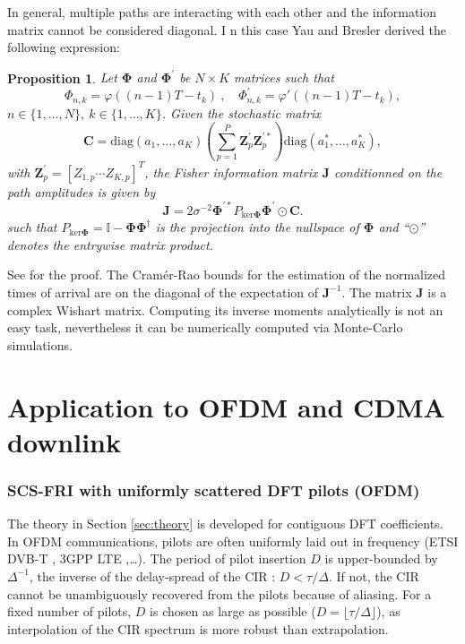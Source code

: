 \documentclass[journal,10pt]{IEEEtran}
\providecommand{\mat}[1]{\boldsymbol{#1}}
\providecommand{\vct}[1]{\boldsymbol{#1}}
\providecommand{\pinv}{\dag}
\providecommand{\pinv}{\text{\ding{61}}}
\newtheorem{proposition}{Proposition}
\begin{document}
In general,  multiple paths are interacting with each other and the information matrix cannot be considered diagonal. I	n this case Yau and Bresler \cite{Yau1992} derived the following expression:
\begin{proposition}\cite{Yau1992}\label{prop:nsep}
Let $\mat \Phi$ and $\mat \Phi^\prime$ be $N\times K$ matrices such that
$$\Phi_{n,k}=\varphi((n-1)T-t_k)\ ,\quad\Phi^\prime_{n,k}=\varphi\prime((n-1)T-t_k),$$
$n\in\lbrace 1,\dots,N \rbrace,\ k\in\lbrace 1,\dots,K \rbrace$. Given the stochastic matrix
$$\mat{C}= \text{diag}(a_1,\dots,a_K)\left(\sum_{p=1}^P\vct Z^\prime_p\vct Z^{\prime\ast}_p\right)\text{diag}(a_1^\ast,\dots,a_K^\ast),$$
with $\vct Z^\prime_p=[Z_{1,p}\cdots Z_{K,p}]^T$,
the Fisher information matrix $\mat J$ conditionned on the path amplitudes is given by
\begin{equation}
\mat J=2\sigma^{-2}\mat{\Phi}^{\prime\ast}P_{\text{ker}\mat{\Phi}}\mat{\Phi}^\prime\odot \mat{C}.
\end{equation}
such that $P_{\text{ker}\mat{\Phi}}=\mathbb{I}-\mat\Phi\mat\Phi^\pinv$ is the projection into the nullspace of $\mat\Phi$ and ``$\odot$'' denotes the entrywise matrix product.
\end{proposition}

See \cite{Yau1992} for the proof. The Cram\'er-Rao bounds  for the estimation of the normalized times of arrival are on the diagonal of the expectation of $\mat J^{-1}$.
The matrix $\mat J$ is a complex Wishart matrix. Computing its inverse moments analytically is not an easy task, nevertheless it can be numerically computed via Monte-Carlo simulations.
 

\section{Application to OFDM and CDMA downlink}\label{sec:ofdm}
\subsubsection{SCS-FRI with uniformly scattered DFT pilots (OFDM)}
The theory in Section \ref{sec:theory} is developed for contiguous DFT coefficients. In OFDM communications, pilots are often uniformly laid out in frequency (ETSI DVB-T \cite{ETSI2001}, 3GPP LTE \cite{Dahlman2008},\dots). The period of pilot insertion $D$ is upper-bounded by $\Delta^{-1}$, the inverse of the delay-spread of the CIR : $D<\tau/\Delta$.
If  not, the CIR cannot be unambiguously recovered from the pilots because of aliasing. For a fixed number of pilots, $D$ is chosen as large as possible ($D=\lfloor\tau/\Delta\rfloor$), as interpolation of the CIR spectrum is more robust than extrapolation.
\end{document}
